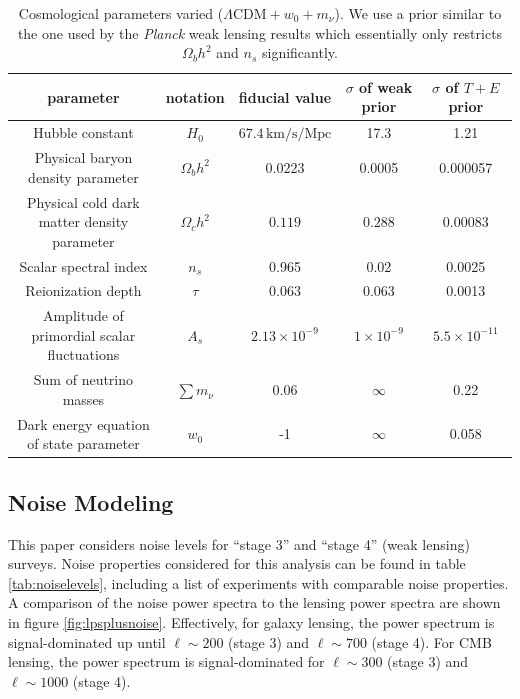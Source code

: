 \documentclass[11pt]{article} %
\begin{document}
\begin{table}[h!]
    \centering
    \scriptsize
    \begin{tabular}{|c|c|c|c|c|}
        \hline
        \textbf{parameter} & \textbf{notation} & \textbf{fiducial value} & \textbf{$\sigma$ of weak prior} & \textbf{$\sigma$ of $T + E$ prior}\\
        \hline
        Hubble constant & $H_0$ & $67.4 \, \text{km/s/Mpc}$ & 17.3 & 1.21\\
        \hline
        Physical baryon density parameter & $\Omega_b h^2$ & $0.0223$ & 0.0005 & 0.000057\\
        \hline
        Physical cold dark matter density parameter & $\Omega_c h^2$ & $0.119$ & $0.288$ & 0.00083\\
        \hline
        Scalar spectral index & $n_s$ & 0.965 & 0.02 & 0.0025 \\
        \hline
        Reionization depth & $\tau$ & 0.063 & 0.063 & 0.0013 \\
        \hline
        Amplitude of primordial scalar fluctuations & $A_s$ & $2.13 \times 10^{-9}$ & $1\times 10^{-9}$ & $5.5\times 10^{-11}$\\
        \hline
        Sum of neutrino masses & $\sum m_\nu$ & $0.06$ & $\infty$ & 0.22\\
        \hline
        Dark energy equation of state parameter & $w_0$ & -1 & $\infty$ & 0.058 \\ 
        \hline
    \end{tabular}
    \caption{Cosmological parameters varied ($\Lambda \text{CDM} + w_0 + m_\nu$). We use a prior similar to the one used by the \textit{Planck} weak lensing results \cite{Planck2018Lensing} which essentially only restricts $\Omega_bh^2$ and $n_s$ significantly.}
    \label{tab:fiducialpars}
\end{table}

\subsection{Noise Modeling}
This paper considers noise levels for ``stage 3'' and ``stage 4'' (weak lensing) surveys. Noise properties considered for this analysis can be found in table \ref{tab:noiselevels}, including a list of experiments with comparable noise properties. A comparison of the noise power spectra to the lensing power spectra are shown     in figure \ref{fig:lpsplusnoise}. Effectively, for galaxy lensing, the power spectrum is signal-dominated up until $\ell \sim 200$ (stage 3) and $\ell \sim 700$ (stage 4). For CMB lensing, the power spectrum is signal-dominated for $\ell \sim 300$ (stage 3) and $\ell \sim 1000$ (stage 4). 
\end{document}
